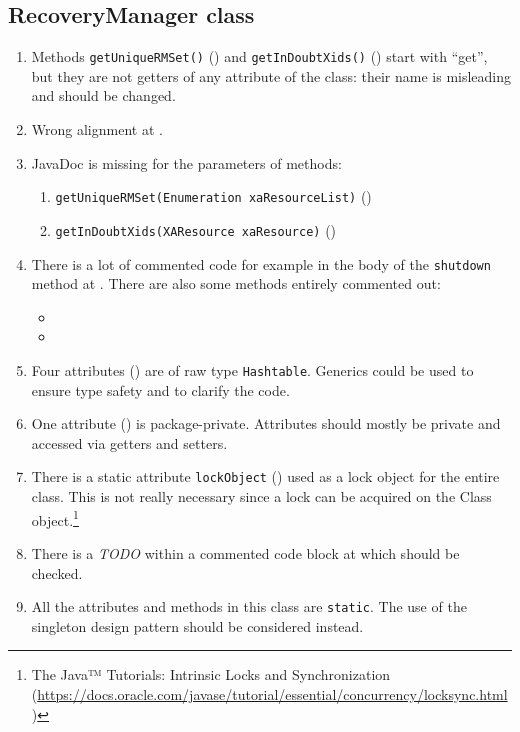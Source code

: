 \subsection{RecoveryManager class}
\label{sec:recoverymanager-class}

\begin{enumerate}
    \item {} Methods \texttt{getUniqueRMSet()} () and \texttt{getInDoubtXids()} () start with ``get'', but they are not getters of any attribute of the class:
    their name is misleading and should be changed.
    \item {} Wrong alignment at .
    \item {} JavaDoc is missing for the parameters of methods:
    \begin{enumerate}
        \item \texttt{getUniqueRMSet(Enumeration xaResourceList)} ()
        \item \texttt{getInDoubtXids(XAResource xaResource)} ()
    \end{enumerate}
	\item {} There is a lot of commented code for example in the body of the \texttt{shutdown} method at . There are also some methods entirely commented out:
	\begin{itemize}
		\item {}
		\item {}
	\end{itemize}
	\item {} Four attributes () are of raw type \texttt{Hashtable}. Generics could be used to ensure type safety and to clarify the code.
    \item {} One attribute () is package-private. Attributes should mostly be private and accessed via getters and setters.
    \item There is a static attribute \texttt{lockObject} () used as a lock object for the entire class. This is not really necessary since a lock can be acquired on the Class object.\footnote{The Java™ Tutorials: Intrinsic Locks and Synchronization (\url{https://docs.oracle.com/javase/tutorial/essential/concurrency/locksync.html})}
    \item There is a \emph{TODO} within a commented code block at  which should be checked.
    \item All the attributes and methods in this class are \texttt{static}. The use of the singleton design pattern should be considered instead.
\end{enumerate}

